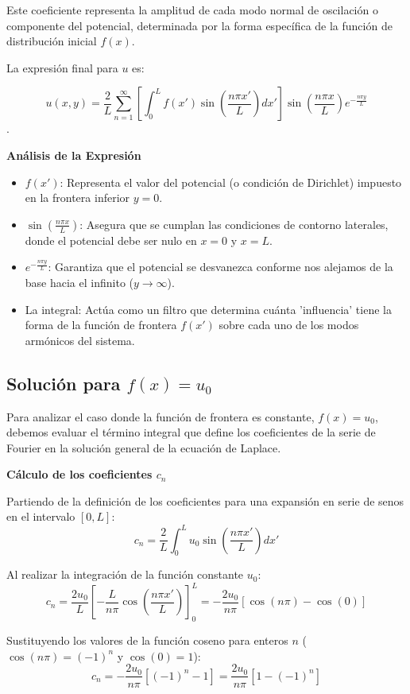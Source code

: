 \documentclass[a4paper]{article}
\begin{document}
Este coeficiente representa la amplitud de cada modo normal de oscilación o componente del potencial, determinada por la forma específica de la función de distribución inicial $f(x)$.

La expresión final para $u$ es:

$$u(x, y) = \frac{2}{L} \sum_{n=1}^{\infty} \left[ \int_0^L f(x') \sin\left(\frac{n\pi x'}{L}\right) dx' \right] \sin\left(\frac{n\pi x}{L}\right) e^{-\frac{n\pi y}{L}}$$.

\textbf{Análisis de la Expresión}
\begin{itemize}
	\item $f(x')$: Representa el valor del potencial (o condición de Dirichlet) impuesto en la frontera inferior $y=0$.
	\item $\sin\left(\frac{n\pi x}{L}\right)$: Asegura que se cumplan las condiciones de contorno laterales, donde el potencial debe ser nulo en $x=0$ y $x=L$.
	\item $e^{-\frac{n\pi y}{L}}$: Garantiza que el potencial se desvanezca conforme nos alejamos de la base hacia el infinito ($y \to \infty$).
	\item La integral: Actúa como un filtro que determina cuánta 'influencia' tiene la forma de la función de frontera $f(x')$ sobre cada uno de los modos armónicos del sistema.
\end{itemize}

\subsection{Solución para $f(x) = u_0$}

Para analizar el caso donde la función de frontera es constante, $f(x) = u_0$, debemos evaluar el término integral que define los coeficientes de la serie de Fourier en la solución general de la ecuación de Laplace.


\textbf{Cálculo de los coeficientes $c_n$}

Partiendo de la definición de los coeficientes para una expansión en serie de senos en el intervalo $[0, L]$:
$$c_n = \frac{2}{L} \int_0^L u_0 \sin\left(\frac{n\pi x'}{L}\right) dx'$$

Al realizar la integración de la función constante $u_0$:
$$c_n = \frac{2u_0}{L} \left[ -\frac{L}{n\pi} \cos\left(\frac{n\pi x'}{L}\right) \right]_0^L = -\frac{2u_0}{n\pi} \left[ \cos(n\pi) - \cos(0) \right]$$

Sustituyendo los valores de la función coseno para enteros $n$ ($\cos(n\pi) = (-1)^n$ y $\cos(0) = 1$):
$$c_n = -\frac{2u_0}{n\pi} [(-1)^n - 1] = \frac{2u_0}{n\pi} [1 - (-1)^n]$$
\end{document}
